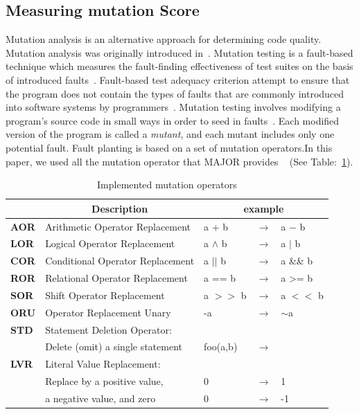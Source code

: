 \documentclass[conference]{IEEEtran}
\begin{document}
\subsection{Measuring mutation Score}
Mutation analysis is an alternative approach for determining code quality. Mutation analysis was originally introduced in~\cite{demillo1978hints,budd1980mutation}. Mutation testing is a fault-based technique which measures the fault-finding effectiveness of test suites on the basis of introduced faults~\cite{demillo1978hints,hamlet1977testing}. Fault-based test adequacy criterion attempt to ensure that the program does not contain the types of faults that are commonly introduced into software systems by programmers~\cite{demillo1978hints}. Mutation testing involves modifying a program's source code in small ways in order to seed in faults~\cite{offutt1994practical}. Each modified version of the program is called a \textit{mutant}, and each mutant includes only one potential fault. Fault planting is based on a set of mutation operators.In this paper, we used all the mutation operator that MAJOR provides ~\cite{just2011major} (See Table:~\ref{table:mutationOpertors}).

\begin{table}[htbp]
\caption{Implemented mutation operators}
\label{table:mutationOpertors}
\begin{tabular}{l l l l l }
\hline
 & \multicolumn{1}{c}{\textbf{Description}} & \multicolumn{ 3}{c}{\textbf{example}} \\ \hline
\textbf{AOR} & Arithmetic Operator Replacement & a + b & \(\to\) & a \(-\) b \\ 
\textbf{LOR} & Logical Operator Replacement & a \(\wedge\) b & \(\to\) & a \(|\) b \\ 
\textbf{COR} & Conditional Operator Replacement & a \(||\) b & \(\to\) & a \&\& b \\ 
\textbf{ROR} & Relational Operator Replacement & a == b & \(\to\) & a \textgreater = b \\ 
\textbf{SOR} & Shift Operator Replacement & a \(>>\) b & \(\to\) & a \(<<\) b \\ \hline
\textbf{ORU} & Operator Replacement Unary & -a & \(\to\) & \(\sim\)a \\ \hline
\textbf{STD} & Statement Deletion Operator:  &  &  &  \\
\textbf{} & Delete (omit) a single statement & foo(a,b) & \(\to\) & \(<no-op>\) \\ \hline
\textbf{LVR} & Literal Value Replacement:  &  &  &  \\ 
\textbf{} & Replace by a positive value, & 0 & \(\to\) & 1 \\
\textbf{} & a negative value, and zero & 0 & \(\to\) & -1 \\ \hline
\end{tabular}
\end{table}
\end{document}

